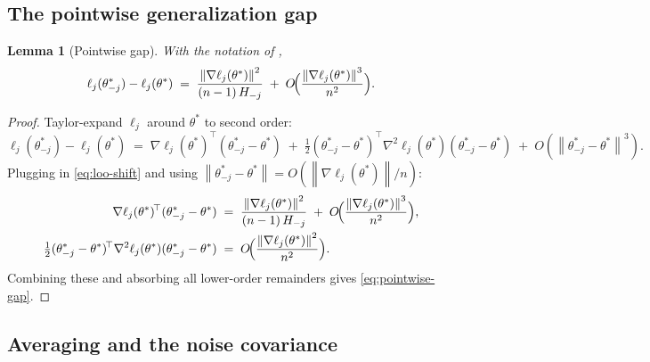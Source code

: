 \documentclass[11pt,a4paper]{article}
\newtheorem{lemma}[theorem]{Lemma}
\theoremstyle{definition}
\theoremstyle{remark}
\newcommand{\norm}[1]{\left\|#1\right\|}
\begin{document}
\subsection{The pointwise generalization gap}

\begin{lemma}[Pointwise gap]\label{lem:pointwise-gap}
   With the notation of ,
   \begin{equation}\label{eq:pointwise-gap}
      \ell_j(\theta^*_{-j}) - \ell_j(\theta^*)
      \;=\; \frac{\norm{\nabla\ell_j(\theta^*)}^2}{(n-1)\,H_{-j}}
            \;+\; O\!\Bigl(\frac{\norm{\nabla\ell_j(\theta^*)}^3}{n^2}
                          \Bigr).
   \end{equation}
\end{lemma}

\begin{proof}
   Taylor-expand $\ell_j$ around $\theta^*$ to second order:
   \[
      \ell_j(\theta^*_{-j}) - \ell_j(\theta^*)
      \;=\; \nabla\ell_j(\theta^*)^{\!\top}(\theta^*_{-j}-\theta^*)
            \;+\; \tfrac{1}{2}(\theta^*_{-j}-\theta^*)^{\!\top}
                  \nabla^2\ell_j(\theta^*)
                  (\theta^*_{-j}-\theta^*)
            \;+\; O(\norm{\theta^*_{-j}-\theta^*}^3).
   \]
   Plugging in \eqref{eq:loo-shift} and using $\norm{\theta^*_{-j}
   -\theta^*} = O(\norm{\nabla\ell_j(\theta^*)}/n)$:
   \begin{align*}
      \nabla\ell_j(\theta^*)^{\!\top}(\theta^*_{-j}-\theta^*)
      &\;=\; \frac{\norm{\nabla\ell_j(\theta^*)}^2}{(n-1)\,H_{-j}}
             \;+\; O\!\Bigl(\frac{\norm{\nabla\ell_j(\theta^*)}^3}{n^2}\Bigr),\\
      \tfrac{1}{2}(\theta^*_{-j}-\theta^*)^{\!\top}
                  \nabla^2\ell_j(\theta^*)
                  (\theta^*_{-j}-\theta^*)
      &\;=\; O\!\Bigl(\frac{\norm{\nabla\ell_j(\theta^*)}^2}{n^2}\Bigr).
   \end{align*}
   Combining these and absorbing all lower-order remainders gives
   \eqref{eq:pointwise-gap}.
\end{proof}

\subsection{Averaging and the noise covariance}
\end{document}
